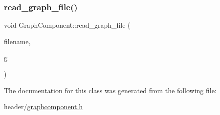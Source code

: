 \mbox{\label{class_graph_component_a680363eab8b992d739f055bd484bc000}} 
\subsubsection{\texorpdfstring{read\+\_\+graph\+\_\+file()}{read\_graph\_file()}}
{\footnotesize\ttfamily void Graph\+Component\+::read\+\_\+graph\+\_\+file (\begin{DoxyParamCaption}\item[{std\+::string}]{filename,  }\item[{\hyperlink{class_graph_component_a982e0748a6e1b8dc74986f5f8b3dca5c}{the\+Graph} \&}]{g }\end{DoxyParamCaption})}



The documentation for this class was generated from the following file\+:\begin{DoxyCompactItemize}
\item 
header/\hyperlink{graphcomponent_8h}{graphcomponent.\+h}\end{DoxyCompactItemize}
